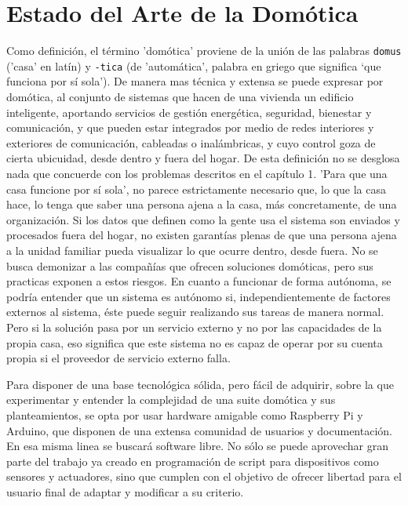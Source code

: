 \cleardoublepage

\chapter{Estado del Arte de la Domótica}
\label{ch:Capitulo2}

Como definición, el término 'domótica' proviene de la unión de las palabras \verb|domus| ('casa' en latín) y \verb|-tica| (de 'automática', palabra en griego que significa ‘que funciona por sí sola’). De manera mas técnica y extensa se puede expresar por domótica, al conjunto de sistemas que hacen de una vivienda un edificio inteligente, aportando servicios de gestión energética, seguridad, bienestar y comunicación, y que pueden estar integrados por medio de redes interiores y exteriores de comunicación, cableadas o inalámbricas, y cuyo control goza de cierta ubicuidad, desde dentro y fuera del hogar. De esta definición no se desglosa nada que concuerde con los problemas descritos en el capítulo 1. 'Para que una casa funcione por sí sola', no parece estrictamente necesario que, lo que la casa hace, lo tenga que saber una persona ajena a la casa, más concretamente, de una organización. Si los datos que definen como la gente usa el sistema son enviados y procesados fuera del hogar, no existen garantías plenas de que una persona ajena a la unidad familiar pueda visualizar lo que ocurre dentro, desde fuera. No se busca demonizar a las compañías que ofrecen soluciones domóticas, pero sus practicas exponen a estos riesgos. En cuanto a funcionar de forma autónoma, se podría entender que un sistema es autónomo si, independientemente de factores externos al sistema, éste puede seguir realizando sus tareas de manera normal. Pero si la solución pasa por un servicio externo y no por las capacidades de la propia casa, eso significa que este sistema no es capaz de operar por su cuenta propia si el proveedor de servicio externo falla.

\vspace{1cm}

Para disponer de una base tecnológica sólida, pero fácil de adquirir, sobre la que experimentar y entender la complejidad de una suite domótica y sus planteamientos, se opta por usar hardware amigable como Raspberry Pi y Arduino, que disponen de una extensa comunidad de usuarios y documentación. En esa misma linea se buscará software libre. No sólo se puede aprovechar gran parte del trabajo ya creado en programación de \gls{script} para dispositivos como sensores y actuadores, sino que cumplen con el objetivo de ofrecer libertad para el usuario final de adaptar y modificar a su criterio.

